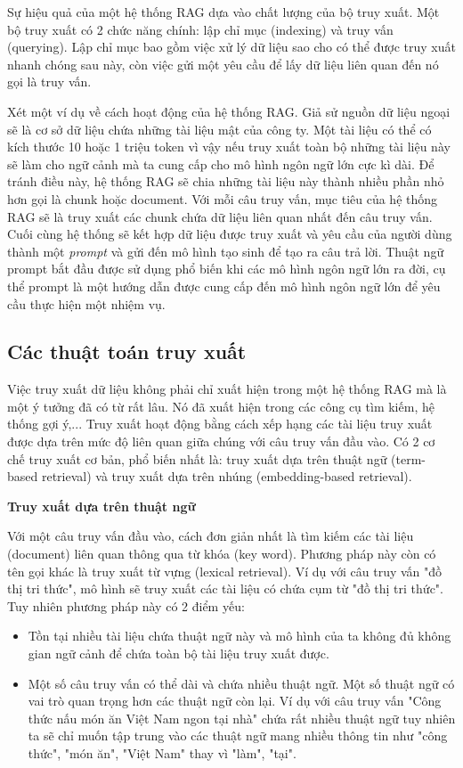 Sự hiệu quả của một hệ thống RAG dựa vào chất lượng của bộ truy xuất. Một bộ truy xuất có 2 chức năng chính: lập chỉ mục (indexing) và truy vấn (querying). Lập chỉ mục bao gồm việc xử lý dữ liệu sao cho có thể được truy xuất nhanh chóng sau này, còn việc gửi một yêu cầu để lấy dữ liệu liên quan đến nó gọi là truy vấn.

Xét một ví dụ về cách hoạt động của hệ thống RAG. Giả sử nguồn dữ liệu ngoại sẽ là cơ sở dữ liệu chứa những tài liệu mật của công ty. Một tài liệu có thể có kích thước 10 hoặc 1 triệu token vì vậy nếu truy xuất toàn bộ những tài liệu này sẽ làm cho ngữ cảnh mà ta cung cấp cho mô hình ngôn ngữ lớn cực kì dài. Để tránh điều này, hệ thống RAG sẽ chia những tài liệu này thành nhiều phần nhỏ hơn gọi là chunk hoặc document. Với mỗi câu truy vấn, mục tiêu của hệ thống RAG sẽ là truy xuất các chunk chứa dữ liệu liên quan nhất đến câu truy vấn. Cuối cùng hệ thống sẽ kết hợp dữ liệu được truy xuất và yêu cầu của người dùng thành một \textit{prompt} và gửi đến mô hình tạo sinh để tạo ra câu trả lời. Thuật ngữ prompt bắt đầu được sử dụng phổ biến khi các mô hình ngôn ngữ lớn ra đời, cụ thể prompt là một hướng dẫn được cung cấp đến mô hình ngôn ngữ lớn để yêu cầu thực hiện một nhiệm vụ.

\vspace{1em}
\subsection{Các thuật toán truy xuất}
Việc truy xuất dữ liệu không phải chỉ xuất hiện trong một hệ thống RAG mà là một ý tưởng đã có từ rất lâu. Nó đã xuất hiện trong các công cụ tìm kiếm, hệ thống gợi ý,... Truy xuất hoạt động bằng cách xếp hạng các tài liệu truy xuất được dựa trên mức độ liên quan giữa chúng với câu truy vấn đầu vào. Có 2 cơ chế truy xuất cơ bản, phổ biến nhất là: truy xuất dựa trên thuật ngữ (term-based retrieval) và truy xuất dựa trên nhúng (embedding-based retrieval).

\vspace{1em}
\textbf{Truy xuất dựa trên thuật ngữ} 

Với một câu truy vấn đầu vào, cách đơn giản nhất là tìm kiếm các tài liệu (document) liên quan thông qua từ khóa (key word). Phương pháp này còn có tên gọi khác là truy xuất từ vựng (lexical retrieval). Ví dụ với câu truy vấn "đồ thị tri thức", mô hình sẽ truy xuất các tài liệu có chứa cụm từ "đồ thị tri thức". Tuy nhiên phương pháp này có 2 điểm yếu:
\begin{itemize}
    \item Tồn tại nhiều tài liệu chứa thuật ngữ này và mô hình của ta không đủ không gian ngữ cảnh để chứa toàn bộ tài liệu truy xuất được.
    \item Một số câu truy vấn có thể dài và chứa nhiều thuật ngữ. Một số thuật ngữ có vai trò quan trọng hơn các thuật ngữ còn lại. Ví dụ với câu truy vấn "Công thức nấu món ăn Việt Nam ngon tại nhà" chứa rất nhiều thuật ngữ tuy nhiên ta sẽ chỉ muốn tập trung vào các thuật ngữ mang nhiều thông tin như "công thức", "món ăn", "Việt Nam" thay vì "làm", "tại".
\end{itemize}


